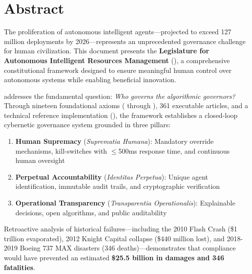 
\chapter*{Abstract}

\begin{executivebox}
The proliferation of autonomous intelligent agents—projected to exceed 127 million deployments by 2026—represents an unprecedented governance challenge for human civilization. This document presents the \textbf{Legislature for Autonomous Intelligent Resources Management} (\lairm{}), a comprehensive constitutional framework designed to ensure meaningful human control over autonomous systems while enabling beneficial innovation.

\vspace{0.5cm}

\lairm{} addresses the fundamental question: \textit{Who governs the algorithmic governors?} Through nineteen foundational axioms ( through ), 361 executable articles, and a technical reference implementation (\aram{}), the framework establishes a closed-loop cybernetic governance system grounded in three pillars:

\begin{enumerate}[leftmargin=2.5cm,label=\textbf{\Roman*.}]
    \item \textbf{Human Supremacy} (\textit{Suprematia Humana}): Mandatory override mechanisms, kill-switches with $\leq$500ms response time, and continuous human oversight
    
    \item \textbf{Perpetual Accountability} (\textit{Identitas Perpetua}): Unique agent identification, immutable audit trails, and cryptographic verification
    
    \item \textbf{Operational Transparency} (\textit{Transparentia Operationalis}): Explainable decisions, open algorithms, and public auditability
\end{enumerate}

\vspace{0.5cm}

Retroactive analysis of historical failures—including the 2010 Flash Crash (\$1 trillion evaporated), 2012 Knight Capital collapse (\$440 million lost), and 2018-2019 Boeing 737 MAX disasters (346 deaths)—demonstrates that \lairm{} compliance would have prevented an estimated \textbf{\$25.5 billion in damages and 346 fatalities}.


\end{executivebox}
